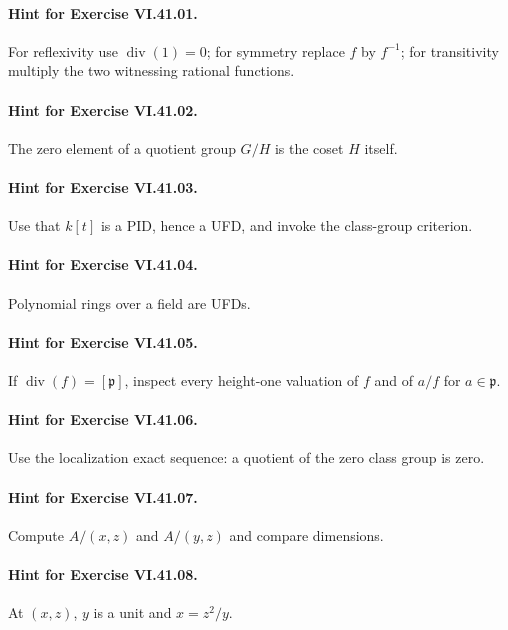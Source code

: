 \paragraph{Hint for Exercise VI.41.01.}
For reflexivity use \(\operatorname{div}(1)=0\); for symmetry replace \(f\) by \(f^{-1}\); for transitivity multiply the two witnessing rational functions.

\paragraph{Hint for Exercise VI.41.02.}
The zero element of a quotient group \(G/H\) is the coset \(H\) itself.

\paragraph{Hint for Exercise VI.41.03.}
Use that \(k[t]\) is a PID, hence a UFD, and invoke the class-group criterion.

\paragraph{Hint for Exercise VI.41.04.}
Polynomial rings over a field are UFDs.

\paragraph{Hint for Exercise VI.41.05.}
If \(\operatorname{div}(f)=[\mathfrak p]\), inspect every height-one valuation of \(f\) and of \(a/f\) for \(a\in\mathfrak p\).

\paragraph{Hint for Exercise VI.41.06.}
Use the localization exact sequence: a quotient of the zero class group is zero.

\paragraph{Hint for Exercise VI.41.07.}
Compute \(A/(x,z)\) and \(A/(y,z)\) and compare dimensions.

\paragraph{Hint for Exercise VI.41.08.}
At \((x,z)\), \(y\) is a unit and \(x=z^2/y\).

